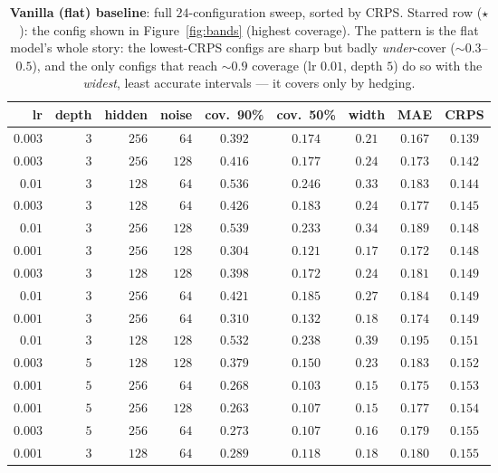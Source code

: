 \documentclass[11pt]{article}
\begin{document}
\begin{table}[H]
  \centering
  \small
  \caption{\textbf{Vanilla (flat) baseline}: full $24$-configuration sweep, sorted by
  CRPS. Starred row ($\star$): the config shown in Figure~\ref{fig:bands} (highest
  coverage). The pattern is the flat model's whole story: the lowest-CRPS configs are
  sharp but badly \emph{under}-cover ($\sim0.3$--$0.5$), and the only configs that
  reach $\sim0.9$ coverage (lr $0.01$, depth $5$) do so with the \emph{widest}, least
  accurate intervals --- it covers only by hedging.}
  \label{tab:vanilla}
  \begin{tabular}{rrrr ccccc}
    \toprule
    lr & depth & hidden & noise & cov.\ 90\% & cov.\ 50\% & width & MAE & CRPS \\
    \midrule
    $0.003$ & $3$ & $256$ & $64$ & $0.392$ & $0.174$ & $0.21$ & $0.167$ & $0.139$ \\
    $0.003$ & $3$ & $256$ & $128$ & $0.416$ & $0.177$ & $0.24$ & $0.173$ & $0.142$ \\
    $0.01$ & $3$ & $128$ & $64$ & $0.536$ & $0.246$ & $0.33$ & $0.183$ & $0.144$ \\
    $0.003$ & $3$ & $128$ & $64$ & $0.426$ & $0.183$ & $0.24$ & $0.177$ & $0.145$ \\
    $0.01$ & $3$ & $256$ & $128$ & $0.539$ & $0.233$ & $0.34$ & $0.189$ & $0.148$ \\
    $0.001$ & $3$ & $256$ & $128$ & $0.304$ & $0.121$ & $0.17$ & $0.172$ & $0.148$ \\
    $0.003$ & $3$ & $128$ & $128$ & $0.398$ & $0.172$ & $0.24$ & $0.181$ & $0.149$ \\
    $0.01$ & $3$ & $256$ & $64$ & $0.421$ & $0.185$ & $0.27$ & $0.184$ & $0.149$ \\
    $0.001$ & $3$ & $256$ & $64$ & $0.310$ & $0.132$ & $0.18$ & $0.174$ & $0.149$ \\
    $0.01$ & $3$ & $128$ & $128$ & $0.532$ & $0.238$ & $0.39$ & $0.195$ & $0.151$ \\
    $0.003$ & $5$ & $128$ & $128$ & $0.379$ & $0.150$ & $0.23$ & $0.183$ & $0.152$ \\
    $0.001$ & $5$ & $256$ & $64$ & $0.268$ & $0.103$ & $0.15$ & $0.175$ & $0.153$ \\
    $0.001$ & $5$ & $256$ & $128$ & $0.263$ & $0.107$ & $0.15$ & $0.177$ & $0.154$ \\
    $0.003$ & $5$ & $256$ & $64$ & $0.273$ & $0.107$ & $0.16$ & $0.179$ & $0.155$ \\
    $0.001$ & $3$ & $128$ & $64$ & $0.289$ & $0.118$ & $0.18$ & $0.180$ & $0.155$ \\

\end{tabular}
\end{table}
\end{document}
